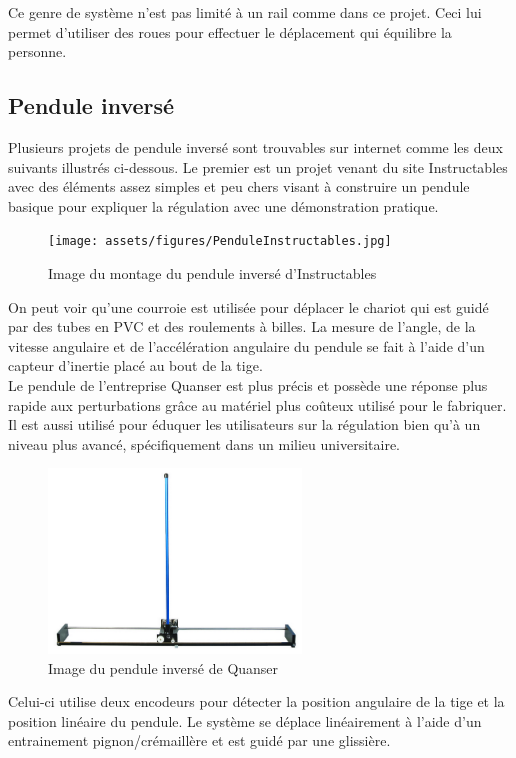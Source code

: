 Ce genre de système n'est pas limité à un rail comme dans ce projet. Ceci lui permet d'utiliser des roues pour effectuer le déplacement qui équilibre la personne.

\subsection{Pendule inversé}

Plusieurs projets de pendule inversé sont trouvables sur internet comme les deux suivants illustrés ci-dessous.
Le premier est un projet venant du site Instructables \cite{Instructables} avec des éléments assez simples et peu chers visant à construire
un pendule basique pour expliquer la régulation avec une démonstration pratique.

\begin{figure}[H]
    \centering
    \texttt{[image: assets/figures/PenduleInstructables.jpg]}
    \caption{Image du montage du pendule inversé d'Instructables \cite{Instructables}}
    \label{fig:Instructables}
\end{figure}

On peut voir qu'une courroie est utilisée pour déplacer le chariot qui est guidé par des tubes en PVC et des roulements à billes. La mesure de l'angle, de la vitesse angulaire et de l'accélération angulaire du pendule se fait à l'aide d'un capteur d'inertie placé au bout de la tige.\\

Le pendule de l'entreprise Quanser est plus précis et possède une réponse plus rapide aux perturbations grâce au matériel plus coûteux utilisé pour le fabriquer. Il est aussi utilisé pour éduquer les utilisateurs sur la régulation bien qu'à un niveau plus avancé, spécifiquement dans un milieu universitaire.

\begin{figure}[H]
    \centering
    \includegraphics[width = 0.6\textwidth]{assets/figures/PenduleQuanser.png}
    \caption{Image du pendule inversé de Quanser \cite{Quanser}}
    \label{fig:Quanser}
\end{figure}

Celui-ci utilise deux encodeurs pour détecter la position angulaire de la tige et la position linéaire du pendule. Le système se déplace linéairement à l'aide d'un entrainement pignon/crémaillère et est guidé par une glissière.